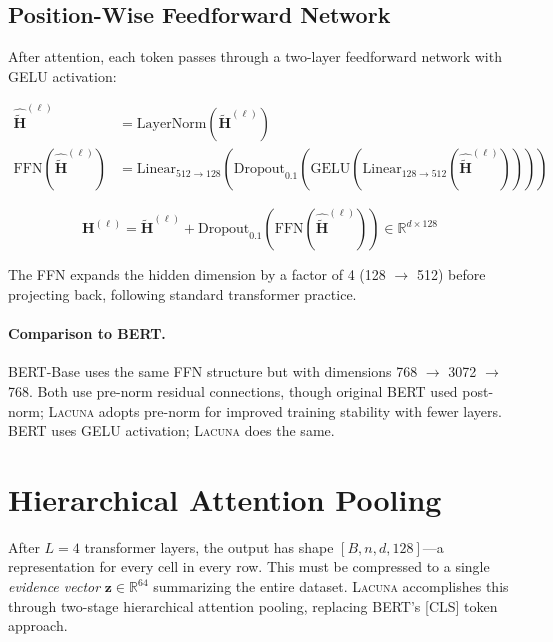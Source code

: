 \documentclass[11pt]{article}
\newcommand{\RR}{\mathbb{R}}
\newcommand{\layernorm}{\text{LayerNorm}}
\newcommand{\gelu}{\text{GELU}}
\newcommand{\ffn}{\text{FFN}}
\newcommand{\lacuna}{\textsc{Lacuna}}
\begin{document}
\subsection{Position-Wise Feedforward Network}

After attention, each token passes through a two-layer feedforward network with GELU activation:

\begin{align}
\hat{\tilde{\mathbf{H}}}^{(\ell)} &= \layernorm\!\left(\tilde{\mathbf{H}}^{(\ell)}\right) \label{eq:prenorm_ff} \\
\ffn(\hat{\tilde{\mathbf{H}}}^{(\ell)}) &= \text{Linear}_{512 \to 128}\!\left(\text{Dropout}_{0.1}\!\left(\gelu\!\left(\text{Linear}_{128 \to 512}\!\left(\hat{\tilde{\mathbf{H}}}^{(\ell)}\right)\right)\right)\right) \label{eq:ffn}
\end{align}

\begin{equation}
\mathbf{H}^{(\ell)} = \tilde{\mathbf{H}}^{(\ell)} + \text{Dropout}_{0.1}\!\left(\ffn(\hat{\tilde{\mathbf{H}}}^{(\ell)})\right) \in \RR^{d \times 128}
\label{eq:ff_residual}
\end{equation}

The FFN expands the hidden dimension by a factor of 4 (128 $\to$ 512) before projecting back, following standard transformer practice.

\paragraph{Comparison to BERT.} BERT-Base uses the same FFN structure but with dimensions 768 $\to$ 3072 $\to$ 768. Both use pre-norm residual connections, though original BERT used post-norm; \lacuna{} adopts pre-norm for improved training stability with fewer layers. BERT uses GELU activation; \lacuna{} does the same.

\section{Hierarchical Attention Pooling}
\label{sec:pooling}

After $L = 4$ transformer layers, the output has shape $[B, n, d, 128]$---a representation for every cell in every row. This must be compressed to a single \emph{evidence vector} $\mathbf{z} \in \RR^{64}$ summarizing the entire dataset. \lacuna{} accomplishes this through two-stage hierarchical attention pooling, replacing BERT's [CLS] token approach.
\end{document}
